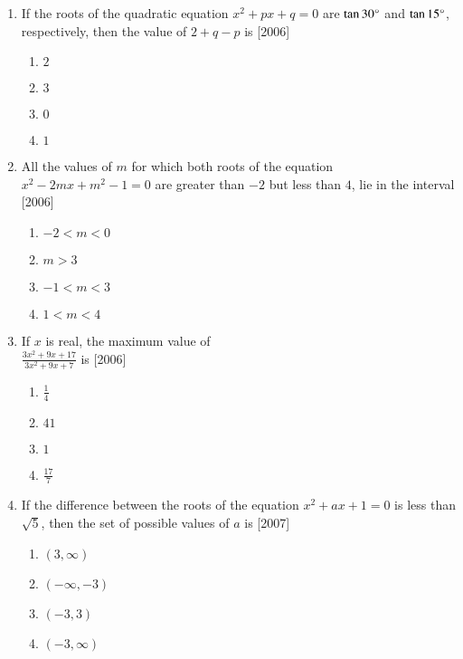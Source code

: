 \documentclass[journal,12pt,twocolumn]{IEEEtran}
\theoremstyle{remark}
\begin{document}
\begin{enumerate}
\item If the roots of the quadratic equation $x^2 + px + q = 0$ are $\tan 30\degree$ and $\tan 15\degree$, respectively, then the value of $2 + q - p$ is
\hfill[2006]

\begin{enumerate}


	\item  $2$
	\item  $3$
	\item  $0$
	\item  $1$
		
\end{enumerate}

\item All the values of $m$ for which both roots of the equation $x^2 - 2mx + m^2 - 1 = 0$ are greater than $-2$ but less than $4$, lie in the interval
\hfill[2006]

\begin{enumerate}

	\item  $-2 < m < 0$
	\item  $m > 3$
	\item  $-1 < m < 3$
	\item  $1 < m < 4$

\end{enumerate}

\item If $x$ is real, the maximum value of\\
$\frac{3x^2 + 9x + 17}{3x^2 + 9x + 7}$ is
\hfill[2006]

\begin{enumerate}

	\item  $\frac{1}{4}$
	\item  $41$
	\item  $1$
	\item  $\frac{17}{7}$

\end{enumerate}

\item If the difference between the roots of the equation $x^2 + ax + 1 = 0$ is less than $\sqrt{5}$, then the set of possible values of $a$ is
\hfill[2007]

\begin{enumerate}

	\item  $(3,\infty)$
	\item  $(-\infty, -3)$
	\item  $(-3, 3)$
	\item  $(-3, \infty)$


\end{enumerate}
\end{enumerate}
\end{document}
